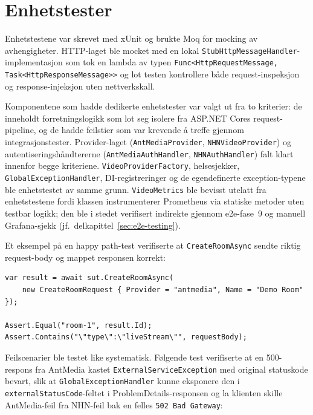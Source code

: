 \section{Enhetstester}
\label{sec:enhetstester}

Enhetstestene var skrevet med xUnit og brukte Moq for mocking av
avhengigheter. HTTP-laget ble mocket med en lokal
\texttt{StubHttpMessageHandler}-implementasjon som tok en lambda av typen
\texttt{Func<HttpRequestMessage, Task<HttpResponseMessage>>} og lot
testen kontrollere både request-inspeksjon og response-injeksjon uten
nettverkskall.

Komponentene som hadde dedikerte enhetstester var valgt ut fra to
kriterier: de inneholdt forretningslogikk som lot seg isolere fra
ASP.NET Cores request-pipeline, og de hadde feilstier som var krevende
å treffe gjennom integrasjonstester. Provider-laget
(\texttt{AntMediaProvider}, \texttt{NHNVideoProvider}) og
autentiseringshåndtererne (\texttt{AntMediaAuthHandler},
\texttt{NHNAuthHandler}) falt klart innenfor begge kriteriene.
\texttt{VideoProviderFactory}, helsesjekker, \texttt{GlobalExceptionHandler},
DI-registreringer og de egendefinerte exception-typene ble enhetstestet
av samme grunn. \texttt{VideoMetrics} ble bevisst utelatt fra
enhetstestene fordi klassen instrumenterer Prometheus via statiske
metoder uten testbar logikk; den ble i stedet verifisert indirekte
gjennom \gls{e2e}-fase~9 og manuell Grafana-sjekk
(jf.\ delkapittel~\ref{sec:e2e-testing}).

Et eksempel på en happy path-test verifiserte at
\texttt{CreateRoomAsync} sendte riktig request-body og mappet responsen
korrekt:

\begin{lstlisting}[language={[Sharp]C},
  caption={CreateRoomAsync — happy path}]
var result = await sut.CreateRoomAsync(
    new CreateRoomRequest { Provider = "antmedia", Name = "Demo Room" });

Assert.Equal("room-1", result.Id);
Assert.Contains("\"type\":\"liveStream\"", requestBody);
\end{lstlisting}

Feilscenarier ble testet like systematisk. Følgende test verifiserte at
en 500-respons fra AntMedia kastet \texttt{ExternalServiceException}
med original statuskode bevart, slik at \texttt{GlobalExceptionHandler}
kunne eksponere den i \texttt{externalStatusCode}-feltet i
ProblemDetails-responsen og la klienten skille AntMedia-feil fra
NHN-feil bak en felles \texttt{502 Bad Gateway}:

